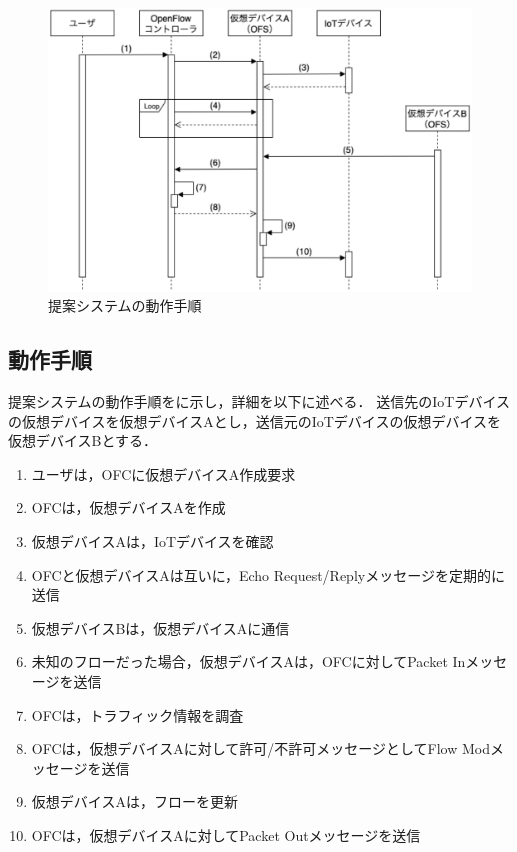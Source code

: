 \documentclass[a4paper,10pt,twocolumn,uplatex]{jsarticle}
\begin{document}
\begin{figure}[!tb]
  \centering
  \includegraphics[width=\linewidth]{img/sequence.eps}
  \caption{提案システムの動作手順}
  \label{fig:sequence}
\end{figure}

\subsection{動作手順}
提案システムの動作手順をに示し，詳細を以下に述べる．
送信先のIoTデバイスの仮想デバイスを仮想デバイスAとし，送信元のIoTデバイスの仮想デバイスを仮想デバイスBとする．

\begin{enumerate}
  \item ユーザは，OFCに仮想デバイスA作成要求
  \item OFCは，仮想デバイスAを作成
  \item 仮想デバイスAは，IoTデバイスを確認
  \item OFCと仮想デバイスAは互いに，Echo Request/Replyメッセージを定期的に送信
  \item 仮想デバイスBは，仮想デバイスAに通信
  \item 未知のフローだった場合，仮想デバイスAは，OFCに対してPacket Inメッセージを送信
  \item OFCは，トラフィック情報を調査
  \item OFCは，仮想デバイスAに対して許可/不許可メッセージとしてFlow Modメッセージを送信
  \item 仮想デバイスAは，フローを更新
  \item OFCは，仮想デバイスAに対してPacket Outメッセージを送信
\end{enumerate}
\end{document}
